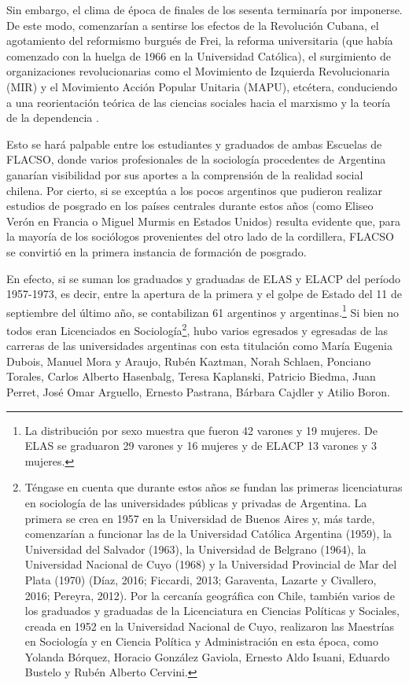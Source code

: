 Sin embargo, el clima de época de finales de los sesenta terminaría por imponerse. De este modo, comenzarían a sentirse los efectos de la Revolución Cubana, el agotamiento del reformismo burgués de Frei, la reforma universitaria (que había comenzado con la huelga de 1966 en la Universidad Católica), el surgimiento de organizaciones revolucionarias como el Movimiento de Izquierda Revolucionaria (MIR) y el Movimiento Acción Popular Unitaria (MAPU), etcétera, conduciendo a una reorientación teórica de las ciencias sociales hacia el marxismo y la teoría de la dependencia \parencite{1452-VASCONI1995}.

Esto se hará palpable entre los estudiantes y graduados de ambas Escuelas de FLACSO, donde varios profesionales de la sociología procedentes de Argentina ganarían visibilidad por sus aportes a la comprensión de la realidad social chilena. Por cierto, si se exceptúa a los pocos argentinos que pudieron realizar estudios de posgrado en los países centrales durante estos años (como Eliseo Verón en Francia o Miguel Murmis en Estados Unidos) resulta evidente que, para la mayoría de los sociólogos provenientes del otro lado de la cordillera, FLACSO se convirtió en la primera instancia de formación de posgrado.

En efecto, si se suman los graduados y graduadas de ELAS y ELACP del período 1957-1973, es decir, entre la apertura de la primera y el golpe de Estado del 11 de septiembre del último año, se contabilizan 61 argentinos y argentinas.\footnote{La distribución por sexo muestra que fueron 42 varones y 19 mujeres. De ELAS se graduaron 29 varones y 16 mujeres y de ELACP 13 varones y 3 mujeres.} Si bien no todos eran Licenciados en Sociología\footnote{Téngase en cuenta que durante estos años se fundan las primeras licenciaturas en sociología de las universidades públicas y privadas de Argentina. La primera se crea en 1957 en la Universidad de Buenos Aires y, más tarde, comenzarían a funcionar las de la Universidad Católica Argentina (1959), la Universidad del Salvador (1963), la Universidad de Belgrano (1964), la Universidad Nacional de Cuyo (1968) y la Universidad Provincial de Mar del Plata (1970) (Díaz, 2016; Ficcardi, 2013; Garaventa, Lazarte y Civallero, 2016; Pereyra, 2012). Por la cercanía geográfica con Chile, también varios de los graduados y graduadas de la Licenciatura en Ciencias Políticas y Sociales, creada en 1952 en la Universidad Nacional de Cuyo, realizaron las Maestrías en Sociología y en Ciencia Política y Administración en esta época, como Yolanda Bórquez, Horacio González Gaviola, Ernesto Aldo Isuani, Eduardo Bustelo y Rubén Alberto Cervini.}, hubo varios egresados y egresadas de las carreras de las universidades argentinas con esta titulación como María Eugenia Dubois, Manuel Mora y Araujo, Rubén Kaztman, Norah Schlaen, Ponciano Torales, Carlos Alberto Hasenbalg, Teresa Kaplanski, Patricio Biedma, Juan Perret, José Omar Arguello, Ernesto Pastrana, Bárbara Cajdler y Atilio Boron.

